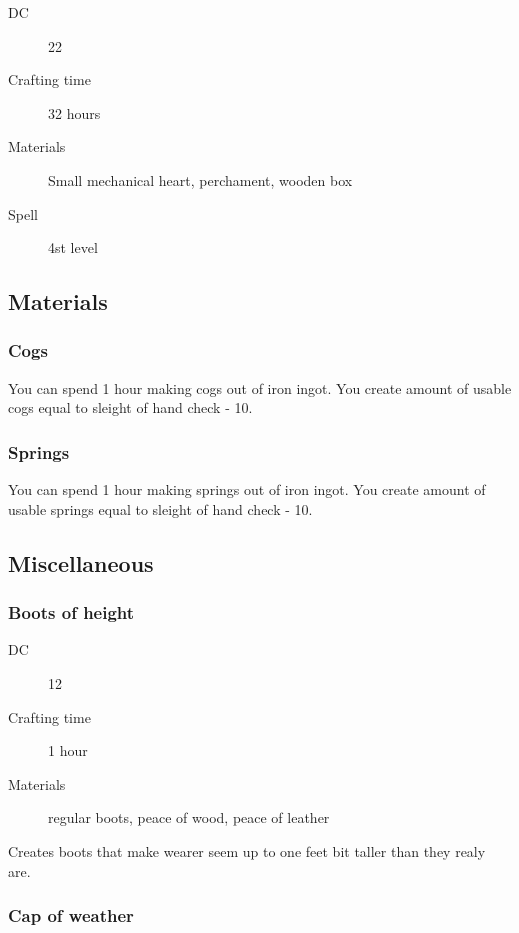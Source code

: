 \begin{description}
\item [DC] 22 \arcana
\item [Crafting time] 32 hours
\item [Materials] Small mechanical heart, perchament, wooden box
\item [Spell] 4st level
\end{description}

\subsection{Materials}

\subsubsection{Cogs}

You can spend 1 hour making cogs out of iron ingot. You create amount of usable cogs equal to sleight of hand check - 10.

\subsubsection{Springs}

You can spend 1 hour making springs out of iron ingot. You create amount of usable springs equal to sleight of hand check - 10.

\subsection{Miscellaneous}

\subsubsection{Boots of height}

\begin{description}
\item [DC] 12 \sleightofhand
\item [Crafting time] 1 hour
\item [Materials] regular boots, peace of wood, peace of leather
\end{description}

Creates boots that make wearer seem up to one feet bit taller than they realy are.

\subsubsection{Cap of weather}

